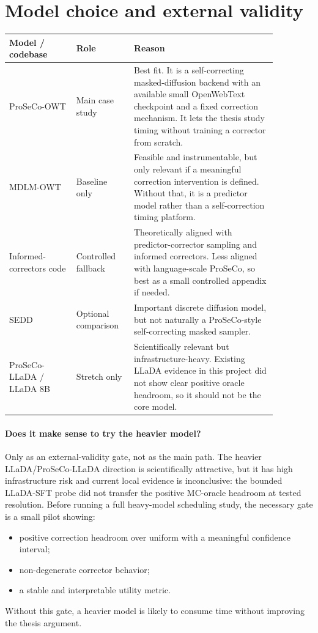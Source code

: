 \documentclass[11pt]{article}
\begin{document}
\section*{Model choice and external validity}

\begin{center}
\small
\begin{tabular}{p{0.22\linewidth}p{0.18\linewidth}p{0.47\linewidth}}
\toprule
Model / codebase & Role & Reason \\
\midrule
ProSeCo-OWT & Main case study &
Best fit.  It is a self-correcting masked-diffusion backend with an available
small OpenWebText checkpoint and a fixed correction mechanism.  It lets the
thesis study timing without training a corrector from scratch. \\
\addlinespace
MDLM-OWT & Baseline only &
Feasible and instrumentable, but only relevant if a meaningful correction
intervention is defined.  Without that, it is a predictor model rather than a
self-correction timing platform. \\
\addlinespace
Informed-correctors code & Controlled fallback &
Theoretically aligned with predictor-corrector sampling and informed
correctors.  Less aligned with language-scale ProSeCo, so best as a small
controlled appendix if needed. \\
\addlinespace
SEDD & Optional comparison &
Important discrete diffusion model, but not naturally a ProSeCo-style
self-correcting masked sampler. \\
\addlinespace
ProSeCo-LLaDA / LLaDA 8B & Stretch only &
Scientifically relevant but infrastructure-heavy.  Existing LLaDA evidence in
this project did not show clear positive oracle headroom, so it should not be
the core model. \\
\bottomrule
\end{tabular}
\end{center}

\paragraph{Does it make sense to try the heavier model?}
Only as an external-validity gate, not as the main path.  The heavier
LLaDA/ProSeCo-LLaDA direction is scientifically attractive, but it has high
infrastructure risk and current local evidence is inconclusive: the bounded
LLaDA-SFT probe did not transfer the positive MC-oracle headroom at tested
resolution.  Before running a full heavy-model scheduling study, the necessary
gate is a small pilot showing:
\begin{itemize}
\item positive correction headroom over uniform with a meaningful confidence
interval;
\item non-degenerate corrector behavior;
\item a stable and interpretable utility metric.
\end{itemize}
Without this gate, a heavier model is likely to consume time without improving
the thesis argument.
\end{document}
